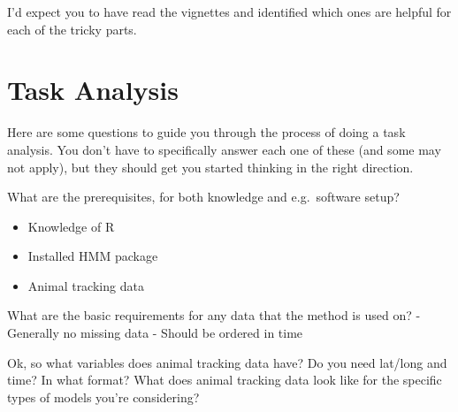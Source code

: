 \documentclass[
  letterpaper,
  DIV=11,
  numbers=noendperiod]{scrreprt}
\providecommand{\tightlist}{%
  \setlength{\itemsep}{0pt}\setlength{\parskip}{0pt}}
\begin{document}
\begin{tcolorbox}[enhanced jigsaw, colback=white, colbacktitle=quarto-callout-note-color!10!white, coltitle=black, opacitybacktitle=0.6, bottomrule=.15mm, colframe=quarto-callout-note-color-frame, toptitle=1mm, leftrule=.75mm, opacityback=0, bottomtitle=1mm, toprule=.15mm, rightrule=.15mm, titlerule=0mm, breakable, left=2mm, arc=.35mm, title=\textcolor{quarto-callout-note-color}{\faInfo}\hspace{0.5em}{Note}]

I'd expect you to have read the vignettes and identified which ones are
helpful for each of the tricky parts.

\end{tcolorbox}

\chapter{Task Analysis}\label{task-analysis}

Here are some questions to guide you through the process of doing a task
analysis. You don't have to specifically answer each one of these (and
some may not apply), but they should get you started thinking in the
right direction.

What are the prerequisites, for both knowledge and e.g.~software setup?

\begin{itemize}
\tightlist
\item
  Knowledge of R
\item
  Installed HMM package
\item
  Animal tracking data
\end{itemize}

What are the basic requirements for any data that the method is used on?
- Generally no missing data - Should be ordered in time

\begin{tcolorbox}[enhanced jigsaw, colback=white, colbacktitle=quarto-callout-note-color!10!white, coltitle=black, opacitybacktitle=0.6, bottomrule=.15mm, colframe=quarto-callout-note-color-frame, toptitle=1mm, leftrule=.75mm, opacityback=0, bottomtitle=1mm, toprule=.15mm, rightrule=.15mm, titlerule=0mm, breakable, left=2mm, arc=.35mm, title=\textcolor{quarto-callout-note-color}{\faInfo}\hspace{0.5em}{Note}]

Ok, so what variables does animal tracking data have? Do you need
lat/long and time? In what format? What does animal tracking data look
like for the specific types of models you're considering?

\end{tcolorbox}
\end{document}
